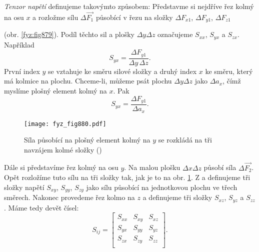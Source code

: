     \emph{Tenzor napětí} definujeme takovýmto způsobem: Představme si nejdříve řez kolmý na osu
    \(x\) a rozložme sílu \(Δ\vec{F_1}\) působící v řezu na složky \(ΔF_{x1}\), \(ΔF_{y1}\),
    \(ΔF_{z1}\){ (obr. \ref{fyz:fig879}). Podíl těchto sil a plošky \(\Delta y\Delta z\) označujeme
    \(S_{xx}\), \(S_{yx}\) a \(S_{zx}\). Například
    \begin{equation*}
      S_{yx}=\frac{\Delta F_{y1}}{\Delta y\,\Delta z}.
    \end{equation*}
    První index \(y\) se vztahuje ke směru silové složky a druhý index \(x\) ke směru, který má
    kolmice na plochu. Chceme-li, můžeme psát plochu \(\Delta y\Delta z\) jako \(\Delta a_x\), čímž
    myslíme plošný element kolmý na \(x\). Pak
    \begin{equation*}
      S_{yx}=\frac{\Delta F_{y1}}{\Delta a_x}.
    \end{equation*}

    \begin{figure}[ht!] %
      \centering
      \texttt{[image: fyz\_fig880.pdf]}
      \caption{Síla působící na plošný element kolmý na \(y\) se rozkládá na tři navzájem kolmé
               složky (\cite[s.~584]{Feynman02})}
      \label{fyz:fig880}
    \end{figure}

    Dále si představíme řez kolmý na osu \(y\). Na malou plošku \(\Delta x \Delta z\) působí síla
    \(Δ\vec{F_2}\). Opět rozložíme tuto sílu na tři složky tak, jak je to na obr. \ref{fyz:fig880}.
    Z a definujeme tři složky napětí \(S_{xy}\), \(S_{yy}\), \(S_{zy}\) jako sílu působící na
    jednotkovou plochu ve třech směrech. Nakonec provedeme řez kolmo na \(z\) a definujeme tři
    složky \(S_{xz}\), \(S_{yz}\) a \(S_{zz}\). Máme tedy devět čísel:
    \begin{equation}\label{fyz:eq951}
      S_{ij}=
        \begin{bmatrix}
          S_{xx} & S_{xy} & S_{xz}  \\
          S_{yx} & S_{yy} & S_{yz}  \\
          S_{zx} & S_{zy} & S_{zz}  \\
        \end{bmatrix}.
    \end{equation}

}
